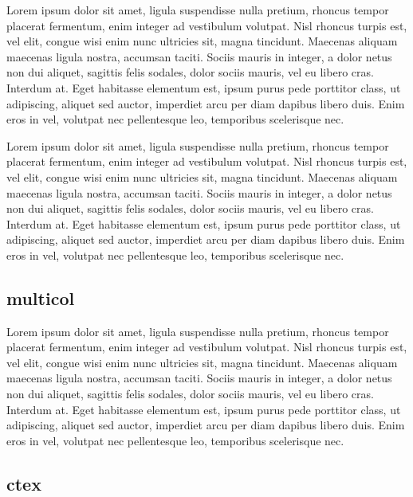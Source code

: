 \documentclass{article}[12pt]
\begin{document}
		\hfill
		\begin{minipage}{0.3\linewidth}
			Lorem ipsum dolor sit amet, ligula suspendisse nulla pretium, rhoncus tempor placerat fermentum, enim integer ad vestibulum volutpat. Nisl rhoncus turpis est, vel elit, congue wisi enim nunc ultricies sit, magna tincidunt. Maecenas aliquam maecenas ligula nostra, accumsan taciti. Sociis mauris in integer, a dolor netus non dui aliquet, sagittis felis sodales, dolor sociis mauris, vel eu libero cras. Interdum at. Eget habitasse elementum est, ipsum purus pede porttitor class, ut adipiscing, aliquet sed auctor, imperdiet arcu per diam dapibus libero duis. Enim eros in vel, volutpat nec pellentesque leo, temporibus scelerisque nec.
		\end{minipage}
		\hfill
		\begin{minipage}{0.3\linewidth}
			Lorem ipsum dolor sit amet, ligula suspendisse nulla pretium, rhoncus tempor placerat fermentum, enim integer ad vestibulum volutpat. Nisl rhoncus turpis est, vel elit, congue wisi enim nunc ultricies sit, magna tincidunt. Maecenas aliquam maecenas ligula nostra, accumsan taciti. Sociis mauris in integer, a dolor netus non dui aliquet, sagittis felis sodales, dolor sociis mauris, vel eu libero cras. Interdum at. Eget habitasse elementum est, ipsum purus pede porttitor class, ut adipiscing, aliquet sed auctor, imperdiet arcu per diam dapibus libero duis. Enim eros in vel, volutpat nec pellentesque leo, temporibus scelerisque nec.
		\end{minipage}
		
	\newpage
	\subsection{multicol}
		\begin{multicols}{2}
			Lorem ipsum dolor sit amet, ligula suspendisse nulla pretium, rhoncus tempor placerat fermentum, enim integer ad vestibulum volutpat. Nisl rhoncus turpis est, vel elit, congue wisi enim nunc ultricies sit, magna tincidunt. Maecenas aliquam maecenas ligula nostra, accumsan taciti. Sociis mauris in integer, a dolor netus non dui aliquet, sagittis felis sodales, dolor sociis mauris, vel eu libero cras. Interdum at. Eget habitasse elementum est, ipsum purus pede porttitor class, ut adipiscing, aliquet sed auctor, imperdiet arcu per diam dapibus libero duis. Enim eros in vel, volutpat nec pellentesque leo, temporibus scelerisque nec.
		\end{multicols}

	\subsection{ctex}
		
\end{document}
